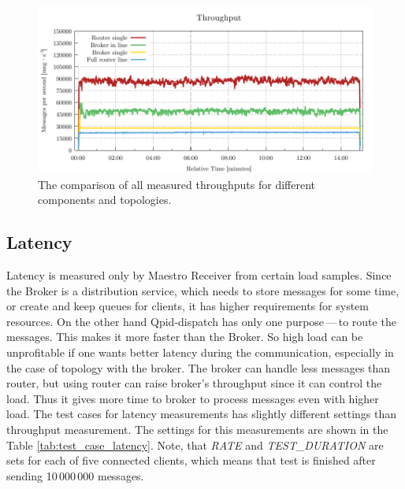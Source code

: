 \begin{figure}[H]
	\centering
	\includegraphics[width=1\linewidth]{obrazky-figures/charts/basic-throughput.pdf}
	\caption{The comparison of all measured throughputs for different components and topologies.}
	\label{fig:basic-throughput-comparison}
\end{figure}


\subsection{Latency}
\label{Latency}
Latency is measured only by Maestro Receiver from certain load samples. Since the Broker is a distribution service, which needs to store messages for some time, or create and keep queues for clients, it has higher requirements for system resources. On the other hand Qpid-dispatch has only one purpose\,---\,to route the messages. This makes it more faster than the Broker. So high load can be unprofitable if one wants better latency during the communication, especially in the case of topology with the broker. The broker can handle less messages than router, but using router can raise broker's throughput since it can control the load. Thus it gives more time to broker to process messages even with higher load. The test cases for latency measurements has slightly different settings than throughput measurement. The settings for this measurements are shown in the Table \ref{tab:test_case_latency}. Note, that \emph{RATE} and \emph{TEST\_DURATION} are sets for each of five connected clients, which means that test is finished after sending 10\,000\,000 messages.

